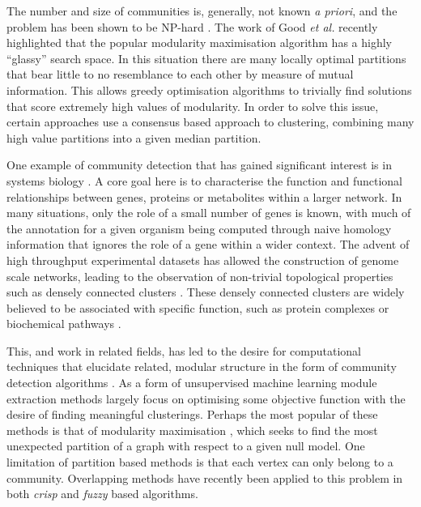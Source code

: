 \documentclass[a4paper,10pt]{article}
\begin{document}
The number and size of communities is, generally, not known \textit{a priori}, and the problem has been shown to be NP-hard \cite{npHardModularity}.
The work of Good \textit{et al.} \cite{good2010performance} recently highlighted that the popular modularity maximisation algorithm has a highly ``glassy'' search space.
In this situation there are many locally optimal partitions that bear little to no resemblance to each other by measure of mutual information.
This allows greedy optimisation algorithms \cite{blondel2008fast} to trivially find solutions that score extremely high values of modularity.
In order to solve this issue, certain approaches use a consensus based approach to clustering, combining many high value partitions into a given median partition.

One example of community detection that has gained significant interest is in systems biology \cite{}.
A core goal here is to characterise the function and functional relationships between genes, proteins or metabolites within a larger network.
In many situations, only the role of a small number of genes is known, with much of the annotation for a given organism being computed through naive homology information that ignores the role of a gene within a wider context.
The advent of high throughput experimental datasets has allowed the construction of genome scale networks, leading to the observation of non-trivial topological properties such as densely connected clusters \cite{ArabidopsisConsortium2011}.
These densely connected clusters are widely believed to be associated with specific function, such as protein complexes or biochemical pathways \cite{}.

This, and work in related fields, has led to the desire for computational techniques that elucidate related, modular structure in the form of community detection algorithms \cite{fortunato2010community}.
As a form of unsupervised machine learning module extraction methods largely focus on optimising some objective function with the desire of finding meaningful clusterings.
Perhaps the most popular of these methods is that of modularity maximisation \cite{newman2004}, which seeks to find the most unexpected partition of a graph with respect to a given null model.
One limitation of partition based methods is that each vertex can only belong to a community.
Overlapping methods have recently been applied to this problem in both \textit{crisp} \cite{ahn2010link, lancichinetti2011finding} and \textit{fuzzy} \cite{gregory2011fuzzy} based algorithms.
\end{document}
